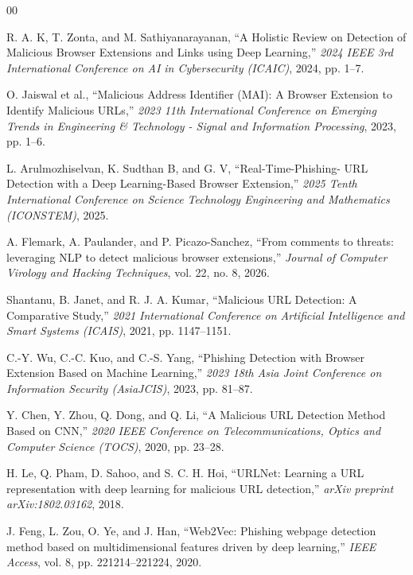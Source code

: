 \documentclass[conference]{IEEEtran}
\begin{document}
\begin{thebibliography}{00}

R. A. K, T. Zonta, and M. Sathiyanarayanan, ``A Holistic Review on Detection of Malicious Browser Extensions and Links using Deep Learning,'' \emph{2024 IEEE 3rd International Conference on AI in Cybersecurity (ICAIC)}, 2024, pp. 1--7.

O. Jaiswal et al., ``Malicious Address Identifier (MAI): A Browser Extension to Identify Malicious URLs,'' \emph{2023 11th International Conference on Emerging Trends in Engineering \& Technology - Signal and Information Processing}, 2023, pp. 1--6.

L. Arulmozhiselvan, K. Sudthan B, and G. V, ``Real-Time-Phishing- URL Detection with a Deep Learning-Based Browser Extension,'' \emph{2025 Tenth International Conference on Science Technology Engineering and Mathematics (ICONSTEM)}, 2025.

A. Flemark, A. Paulander, and P. Picazo-Sanchez, ``From comments to threats: leveraging NLP to detect malicious browser extensions,'' \emph{Journal of Computer Virology and Hacking Techniques}, vol. 22, no. 8, 2026.

Shantanu, B. Janet, and R. J. A. Kumar, ``Malicious URL Detection: A Comparative Study,'' \emph{2021 International Conference on Artificial Intelligence and Smart Systems (ICAIS)}, 2021, pp. 1147--1151.

C.-Y. Wu, C.-C. Kuo, and C.-S. Yang, ``Phishing Detection with Browser Extension Based on Machine Learning,'' \emph{2023 18th Asia Joint Conference on Information Security (AsiaJCIS)}, 2023, pp. 81--87.

Y. Chen, Y. Zhou, Q. Dong, and Q. Li, ``A Malicious URL Detection Method Based on CNN,'' \emph{2020 IEEE Conference on Telecommunications, Optics and Computer Science (TOCS)}, 2020, pp. 23--28.

H. Le, Q. Pham, D. Sahoo, and S. C. H. Hoi, ``URLNet: Learning a URL representation with deep learning for malicious URL detection,'' \emph{arXiv preprint arXiv:1802.03162}, 2018.

J. Feng, L. Zou, O. Ye, and J. Han, ``Web2Vec: Phishing webpage detection method based on multidimensional features driven by deep learning,'' \emph{IEEE Access}, vol. 8, pp. 221214--221224, 2020.


\end{thebibliography}
\end{document}
